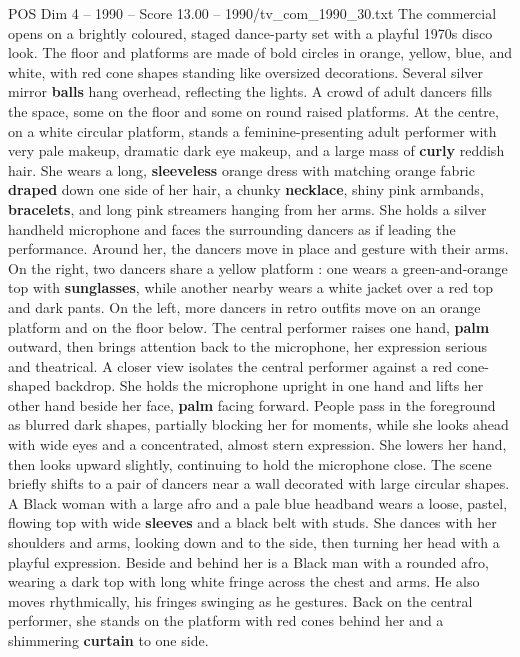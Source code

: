 \begin{textsample}{POS Dim 4 – 1990 – Score 13.00 – 1990/tv\_com\_1990\_30.txt}  \label{ex:f4_pos_079}
The commercial opens on a brightly coloured, staged dance-party set with a playful 1970s disco look.
The floor and platforms are made of bold circles in orange, yellow, blue, and white, with red cone shapes standing like oversized decorations.
Several silver mirror \textbf{balls} hang overhead, reflecting the lights.
A crowd of adult dancers fills the space, some on the floor and some on round raised platforms.
At the centre, on a white circular platform, stands a feminine-presenting adult performer with very pale makeup, dramatic dark eye makeup, and a large mass of \textbf{curly} reddish hair.
She wears a long, \textbf{sleeveless} orange dress with matching orange fabric \textbf{draped} down one side of her hair, a chunky \textbf{necklace}, shiny pink armbands, \textbf{bracelets}, and long pink streamers hanging from her arms.
She holds a silver handheld microphone and faces the surrounding dancers as if leading the performance.
Around her, the dancers move in place and gesture with their arms.
On the right, two dancers share a yellow platform : one wears a green-and-orange top with \textbf{sunglasses}, while another nearby wears a white jacket over a red top and dark pants.
On the left, more dancers in retro outfits move on an orange platform and on the floor below.
The central performer raises one hand, \textbf{palm} outward, then brings attention back to the microphone, her expression serious and theatrical.
A closer view isolates the central performer against a red cone-shaped backdrop.
She holds the microphone upright in one hand and lifts her other hand beside her face, \textbf{palm} facing forward.
People pass in the foreground as blurred dark shapes, partially blocking her for moments, while she looks ahead with wide eyes and a concentrated, almost stern expression.
She lowers her hand, then looks upward slightly, continuing to hold the microphone close.
The scene briefly shifts to a pair of dancers near a wall decorated with large circular shapes.
A Black woman with a large afro and a pale blue headband wears a loose, pastel, flowing top with wide \textbf{sleeves} and a black belt with studs.
She dances with her shoulders and arms, looking down and to the side, then turning her head with a playful expression.
Beside and behind her is a Black man with a rounded afro, wearing a dark top with long white fringe across the chest and arms.
He also moves rhythmically, his fringes swinging as he gestures.
Back on the central performer, she stands on the platform with red cones behind her and a shimmering \textbf{curtain} to one side.

\end{textsample}

